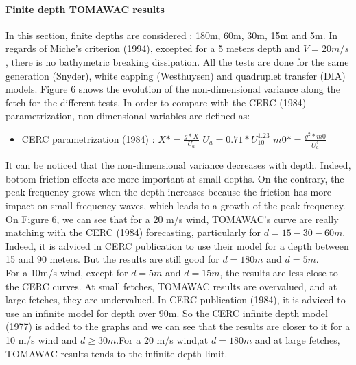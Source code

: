 \paragraph{Finite depth TOMAWAC results}
In this section, finite depths are considered : 180m, 60m, 30m, 15m and 5m. In regards of Miche's criterion (1994), excepted for a 5 meters depth and $V = 20m/s$, there is no bathymetric breaking dissipation. All the tests are done for the same generation (Snyder), white capping (Westhuysen) and quadruplet transfer (DIA) models. Figure 6 shows the evolution of the non-dimensional variance along the fetch for the different tests. In order to compare with the CERC (1984) parametrization, non-dimensional variables are defined as:\\
\begin{itemize}
\item CERC parametrization (1984) :
\subitem $X* = \frac{g*X}{U_a}$
\subitem $U_a = 0.71*U_{10}^{1.23}$
\subitem $m0* = \frac{g^2*m0}{U_a^4}$
\end{itemize}
It can be noticed that the non-dimensional variance decreases with depth. Indeed, bottom friction effects are more important at small depths. On the contrary, the peak frequency grows when the depth increases because the friction has more impact on small frequency waves, which leads to a growth of the peak frequency.\\
On Figure 6, we can see that for a 20 m/s wind, TOMAWAC's curve are really matching with the CERC (1984) forecasting, particularly for $d = 15 - 30 - 60 m$. Indeed, it is adviced in CERC publication to use their model for a depth between 15 and 90 meters. But the results are still good for $d = 180 m$ and $d = 5 m$.\\
For a 10m/s wind, except for $d = 5 m $ and $d = 15 m$, the results are less close to the CERC curves. At small fetches, TOMAWAC results are overvalued, and at large fetches, they are undervalued. In CERC publication (1984), it is adviced to use an infinite model for depth over 90m. So the CERC infinite depth model (1977) is added to the graphs and we can see that the results are closer to it for a 10 m/s wind and $d \geq 30m$.For a 20 m/s wind,at $d = 180m$ and at large fetches, TOMAWAC results tends to the infinite depth limit. 

